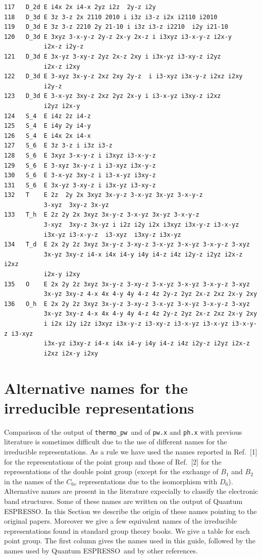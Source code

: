 \documentclass[12pt,a4paper]{article}
\def\qe{{\sc Quantum ESPRESSO}}
\def\thermo{\texttt{thermo\_pw}}
\begin{document}
\begin{verbatim}
117   D_2d E i4x 2x i4-x 2yz i2z  2y-z i2y  
118   D_3d E 3z 3-z 2x 2110 2010 i i3z i3-z i2x i2110 i2010
119   D_3d E 3z 3-z 2210 2y 21-10 i i3z i3-z i2210  i2y i21-10  
120   D_3d E 3xyz 3-x-y-z 2y-z 2x-y 2x-z i i3xyz i3-x-y-z i2x-y 
           i2x-z i2y-z  
121   D_3d E 3x-yz 3-xy-z 2yz 2x-z 2xy i i3x-yz i3-xy-z i2yz 
           i2x-z i2xy  
122   D_3d E 3-xyz 3x-y-z 2xz 2xy 2y-z  i i3-xyz i3x-y-z i2xz i2xy 
           i2y-z  
123   D_3d E 3-x-yz 3xy-z 2xz 2yz 2x-y i i3-x-yz i3xy-z i2xz 
           i2yz i2x-y 
124   S_4  E i4z 2z i4-z 
125   S_4  E i4y 2y i4-y 
126   S_4  E i4x 2x i4-x 
127   S_6  E 3z 3-z i i3z i3-z 
128   S_6  E 3xyz 3-x-y-z i i3xyz i3-x-y-z  
129   S_6  E 3-xyz 3x-y-z i i3-xyz i3x-y-z  
130   S_6  E 3-x-yz 3xy-z i i3-x-yz i3xy-z  
131   S_6  E 3x-yz 3-xy-z i i3x-yz i3-xy-z  
132   T    E 2z  2y 2x 3xyz 3x-y-z 3-x-yz 3x-yz 3-x-y-z 
           3-xyz  3xy-z 3x-yz 
133   T_h  E 2z 2y 2x 3xyz 3x-y-z 3-x-yz 3x-yz 3-x-y-z 
           3-xyz  3xy-z 3x-yz i i2z i2y i2x i3xyz i3x-y-z i3-x-yz 
           i3x-yz i3-x-y-z  i3-xyz  i3xy-z i3x-yz 
134   T_d  E 2x 2y 2z 3xyz 3x-y-z 3-xy-z 3-x-yz 3-x-yz 3-x-y-z 3-xyz
           3x-yz 3xy-z i4-x i4x i4-y i4y i4-z i4z i2y-z i2yz i2x-z i2xz 
           i2x-y i2xy
135   O    E 2x 2y 2z 3xyz 3x-y-z 3-xy-z 3-x-yz 3-x-yz 3-x-y-z 3-xyz
           3x-yz 3xy-z 4-x 4x 4-y 4y 4-z 4z 2y-z 2yz 2x-z 2xz 2x-y 2xy
136   O_h  E 2x 2y 2z 3xyz 3x-y-z 3-xy-z 3-x-yz 3-x-yz 3-x-y-z 3-xyz
           3x-yz 3xy-z 4-x 4x 4-y 4y 4-z 4z 2y-z 2yz 2x-z 2xz 2x-y 2xy
           i i2x i2y i2z i3xyz i3x-y-z i3-xy-z i3-x-yz i3-x-yz i3-x-y-z i3-xyz
           i3x-yz i3xy-z i4-x i4x i4-y i4y i4-z i4z i2y-z i2yz i2x-z 
           i2xz i2x-y i2xy
\end{verbatim}
\newpage
\section{\color{coral}Alternative names for the irreducible representations}
Comparison of the output of \thermo\ and of \texttt{pw.x} and \texttt{ph.x} 
with previous literature is sometimes difficult due to the use of different 
names for the irreducible representations. As a rule we have used the names
reported in Ref.~[1] for the representations of the point group and those
of Ref.~[2] for the representations of the double point group
(except for the exchange of $B_1$ and $B_2$ in the names of the $C_{6v}$ 
representations due to the isomorphism with $D_6$). Alternative
names are present in the literature expecially to classify the electronic
band structures. Some of these names are written on the output
of \qe. In this Section we describe the origin of these names pointing to
the original papers. Moreover we give a few equivalent names of the irreducible representations found in standard 
group theory books. 
We give a table for each point group. The first column gives the names 
used in this guide, followed by the names used by \qe\ and by 
other references.
\end{document}
